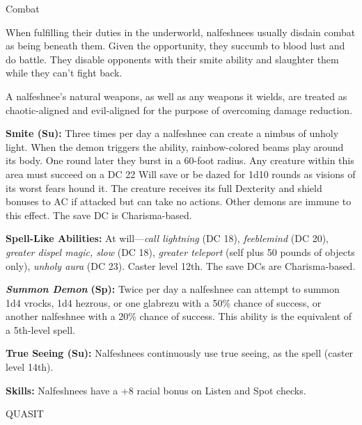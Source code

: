 \documentclass{article}
\begin{document}
Combat

When fulfilling their duties in the underworld, nalfeshnees usually disdain combat 
as being beneath them. Given the opportunity, they succumb to blood lust and do 
battle. They disable opponents with their smite ability and slaughter them while 
they can't fight back.

A nalfeshnee's natural weapons, as well as any weapons it wields, are treated as 
chaotic-aligned and evil-aligned for the purpose of overcoming damage reduction.

\textbf{Smite (Su): }Three times per day a nalfeshnee can create a nimbus of unholy 
light. When the demon triggers the ability, rainbow-colored beams play around its 
body. One round later they burst in a 60-foot radius. Any creature within this 
area must succeed on a DC 22 Will save or be dazed for 1d10 rounds as visions of 
its worst fears hound it. The creature receives its full Dexterity and shield bonuses 
to AC if attacked but can take no actions. Other demons are immune to this effect. 
The save DC is Charisma-based.

\textbf{Spell-Like Abilities: }At will---\textit{call lightning }(DC 18), \textit{feeblemind 
}(DC 20), \textit{greater dispel magic, slow }(DC 18), \textit{greater teleport 
}(self plus 50 pounds of objects only), \textit{unholy aura }(DC 23). Caster level 
12th. The save DCs are Charisma-based.

\textit{\textbf{Summon Demon }}\textbf{(Sp): }Twice per day a nalfeshnee can attempt 
to summon 1d4 vrocks, 1d4 hezrous, or one glabrezu with a 50\% chance of success, 
or another nalfeshnee with a 20\% chance of success. This ability is the equivalent 
of a 5th-level spell.

\textbf{True Seeing (Su): }Nalfeshnees continuously use true seeing, as the spell 
(caster level 14th).

\textbf{Skills: }Nalfeshnees have a +8 racial bonus on Listen and Spot checks.

\vspace{12pt}
QUASIT
\end{document}
